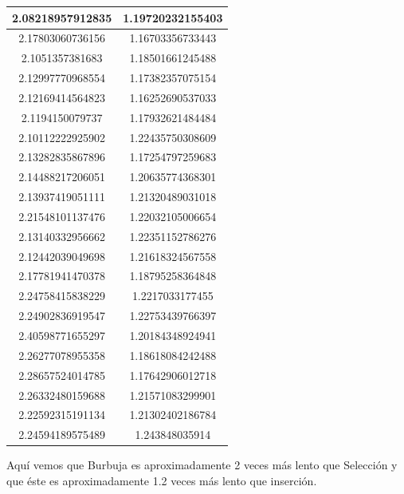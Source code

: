 \documentclass{article}
\begin{document}
\begin{longtable}{|c||c|}
	2.08218957912835	&  1.19720232155403 \\ \hline
	2.17803060736156	&  1.16703356733443 \\ \hline
	2.1051357381683	    &  1.18501661245488 \\ \hline
	2.12997770968554	&  1.17382357075154 \\ \hline
	2.12169414564823	&  1.16252690537033 \\ \hline
	2.1194150079737	    &  1.17932621484484 \\ \hline
	2.10112222925902	&  1.22435750308609 \\ \hline
	2.13282835867896	&  1.17254797259683 \\ \hline
	2.14488217206051	&  1.20635774368301 \\ \hline
	2.13937419051111	&  1.21320489031018 \\ \hline
	2.21548101137476	&  1.22032105006654 \\ \hline
	2.13140332956662	&  1.22351152786276 \\ \hline
	2.12442039049698	&  1.21618324567558 \\ \hline
	2.17781941470378	&  1.18795258364848 \\ \hline
	2.24758415838229	&  1.2217033177455 \\ \hline
	2.24902836919547	&  1.22753439766397 \\ \hline
	2.40598771655297	&  1.20184348924941 \\ \hline
	2.26277078955358	&  1.18618084242488 \\ \hline
	2.28657524014785	&  1.17642906012718 \\ \hline
	2.26332480159688	&  1.21571083299901 \\ \hline
	2.22592315191134	&  1.21302402186784 \\ \hline
	2.24594189575489	&  1.243848035914 \\ \hline
\end{longtable}
Aquí vemos que Burbuja es aproximadamente 2 veces más lento que Selección y que éste es aproximadamente 1.2 veces más lento que inserción.

\
\end{document}

